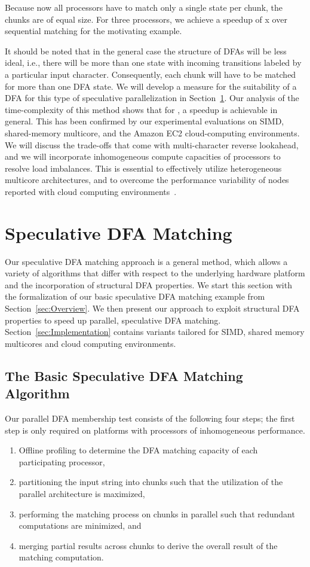 \documentclass[smallextended]{svjour3}
\begin{document}
Because now all processors have to match only a single state per chunk, the chunks
are of equal size. For three processors, we achieve a speedup of x over sequential matching for the
motivating example.

It should be noted that in the general case the structure of DFAs will be less ideal, i.e., there
will be more than one state with incoming transitions labeled by a particular input character.
Consequently, each chunk will have to be matched for more than one DFA state.
We will develop a measure for the suitability of a DFA for this type of speculative parallelization
in Section~\ref{sec:Algorithms}. Our analysis of the time-complexity of this method
shows that for , a speedup is achievable in general. This has been
confirmed by our experimental evaluations on
SIMD, shared-memory multicore, and the Amazon EC2 cloud-computing
environments.
We will discuss the trade-offs that come with multi-character reverse lookahead, and we will
incorporate inhomogeneous compute capacities of processors to resolve load imbalances.
This is essential to effectively utilize heterogeneous multicore architectures, and to overcome
the performance variability of nodes reported with cloud computing environments~\cite{EC2Perf,Armbrust2009}. 

\section{Speculative DFA Matching}\label{sec:Algorithms}
Our speculative DFA matching approach is a general method, which
allows a variety of algorithms that differ with respect to the
underlying hardware platform and the incorporation of
structural
DFA properties. We start this section with the formalization of our basic speculative
DFA matching example from Section~\ref{sec:Overview}.
We then present our approach to exploit structural DFA properties to speed up
parallel, speculative DFA matching. Section~\ref{sec:Implementation} contains variants tailored
for SIMD, shared memory multicores and cloud computing environments.
 
\subsection{The Basic Speculative DFA Matching Algorithm\label{sec:basicAlgo}}
Our parallel DFA membership test consists of the following four steps; the first
step is only required on platforms with processors of inhomogeneous performance.
\begin{enumerate}
\item Offline profiling to determine the DFA matching capacity of each participating processor, 
\item partitioning the input string into chunks such that the 
      utilization of the parallel architecture is maximized,
\item performing the matching process on chunks in parallel such that
      redundant computations are minimized, and
\item merging partial results across chunks to derive the overall result of the matching
      computation.
\end{enumerate}
\end{document}
